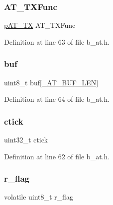 \subsubsection{\texorpdfstring{A\+T\+\_\+\+T\+X\+Func}{AT\_TXFunc}}
{\footnotesize\ttfamily \mbox{\hyperlink{group___a_t___exported___types_definitions_ga160ea044085772742d8b369ae5af1f8e}{p\+A\+T\+\_\+\+TX}} A\+T\+\_\+\+T\+X\+Func}



Definition at line 63 of file b\+\_\+at.\+h.

\mbox{\label{structb_a_t___info__t_a83e2127a0a145240c5097d61e2e6f265}} 
\subsubsection{\texorpdfstring{buf}{buf}}
{\footnotesize\ttfamily uint8\+\_\+t buf\mbox{[}\mbox{\hyperlink{b__config_8h_a017d1f392b7b6a5ccc145cda5724cf83}{\+\_\+\+A\+T\+\_\+\+B\+U\+F\+\_\+\+L\+EN}}\mbox{]}}



Definition at line 64 of file b\+\_\+at.\+h.

\mbox{\label{structb_a_t___info__t_a50b7ce7bdc57a11d0f9faefb4a81b4cc}} 
\subsubsection{\texorpdfstring{ctick}{ctick}}
{\footnotesize\ttfamily uint32\+\_\+t ctick}



Definition at line 62 of file b\+\_\+at.\+h.

\mbox{\label{structb_a_t___info__t_a8c8ca291d9dc486fd71177e6d987c04f}} 
\subsubsection{\texorpdfstring{r\+\_\+flag}{r\_flag}}
{\footnotesize\ttfamily volatile uint8\+\_\+t r\+\_\+flag}



